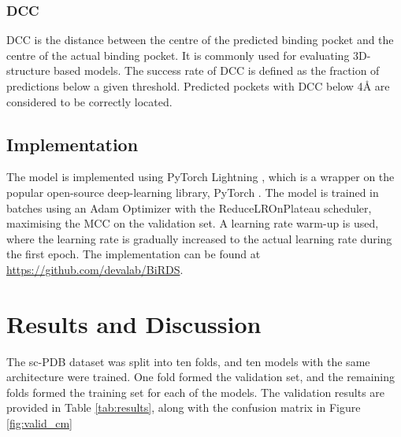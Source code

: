 \documentclass[journal=jacsat,manuscript=article]{achemso}
\begin{document}
\subsubsection{DCC}
DCC is the distance between the centre of the predicted binding pocket and the centre of the actual binding pocket. It is commonly used for evaluating 3D-structure based models. The success rate of DCC is defined as the fraction of predictions below a given threshold. Predicted pockets with DCC below 4{\AA} are considered to be correctly located.

\subsection{Implementation}
\quad The model is implemented using PyTorch Lightning \cite{falcon2019pytorch}, which is a wrapper on the popular open-source deep-learning library, PyTorch \cite{paszke2019pytorch}. The model is trained in batches using an Adam Optimizer with the ReduceLROnPlateau scheduler, maximising the MCC on the validation set. A learning rate warm-up is used, where the learning rate is gradually increased to the actual learning rate during the first epoch. The implementation can be found at \href{https://github.com/devalab/BiRDS}{https://github.com/devalab/BiRDS}.

\section{Results and Discussion}
\quad The sc-PDB\cite{desaphy2015sc} dataset was split into ten folds, and ten models with the same architecture were trained. One fold formed the validation set, and the remaining folds
formed the training set for each of the models. The validation results are provided in Table \ref{tab:results}, along with the confusion matrix in Figure \ref{fig:valid_cm}
\end{document}
